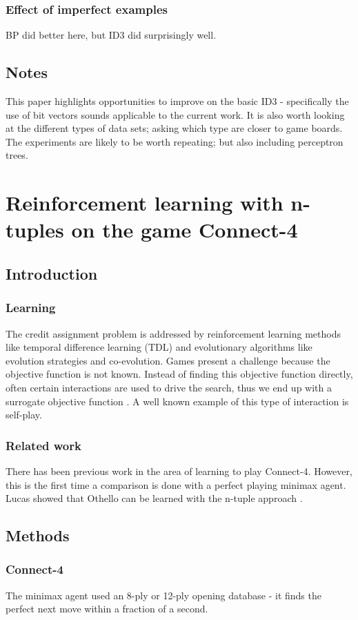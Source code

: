 \subsubsection{Effect of imperfect examples}
BP did better here, but ID3 did surprisingly well.
\subsection{Notes}    
This paper highlights opportunities to improve on the basic ID3 - specifically the use of bit vectors sounds applicable to the current work.  It is also worth looking at the different types of data sets; asking which type are closer to game boards.  The experiments are likely to be worth repeating; but also including perceptron trees\cite{utgoff:trees}. 
\section{Reinforcement learning with n-tuples on the game Connect-4}
\cite{thill:connect-4}
\subsection{Introduction}
\subsubsection{Learning}
The credit assignment problem is addressed by reinforcement learning methods like temporal difference learning (TDL) and
evolutionary algorithms like evolution strategies and co-evolution.  Games present a challenge because the objective function is not known. Instead of finding this objective function directly, often certain interactions are used to drive the search, thus we end up with a surrogate objective function \cite{krawiec:tuple}.  A well known example of this type of interaction is self-play. 
\subsubsection{Related work}
There has been previous work in the area of learning to play Connect-4.  However, this is the first time a comparison is done with a perfect playing minimax agent. Lucas showed that Othello can be learned with the n-tuple approach \cite{lucas:tuple}.	
\subsection{Methods}
\subsubsection{Connect-4}
The minimax agent used an 8-ply or 12-ply opening database - it finds the perfect next move within a fraction of a second.
